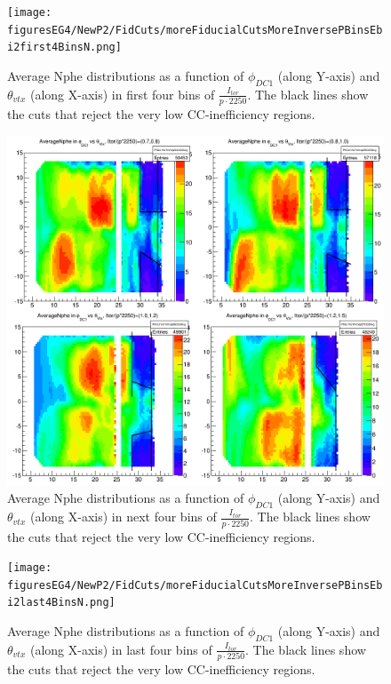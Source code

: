 \begin{figure}[H]%
\centering
\leavevmode \texttt{[image: figuresEG4/NewP2/FidCuts/moreFiducialCutsMoreInversePBinsEbi2first4BinsN.png]}
\caption[Fiducial cuts (first 4 bins)]{Average Nphe distributions as a function of $\phi_{DC1}$ (along Y-axis) and $\theta_{vtx}$ (along X-axis) in first four bins of $\frac{I_{tor}}{p \cdot 2250}$. The black lines show the cuts that reject the very low CC-inefficiency regions.}
\label{figFidAvgNph1}
\end{figure}


\begin{figure}[H]%
\centering
\leavevmode \includegraphics[width=1.1\textwidth]{figuresEG4/NewP2/FidCuts/moreFiducialCutsMoreInversePBinsEbi2next4Bins.png}
\caption[Fiducial cuts (next 4 bins)]{Average Nphe distributions as a function of $\phi_{DC1}$ (along Y-axis) and $\theta_{vtx}$ (along X-axis) in next four bins of $\frac{I_{tor}}{p \cdot 2250}$. The black lines show the cuts that reject the very low CC-inefficiency regions.}
\label{figFidAvgNph1}
\end{figure}


\begin{figure}[H]%
\centering
\leavevmode \texttt{[image: figuresEG4/NewP2/FidCuts/moreFiducialCutsMoreInversePBinsEbi2last4BinsN.png]}
\caption[Fiducial cuts (last 4 bins)]{Average Nphe  distributions as a function of $\phi_{DC1}$ (along Y-axis) and $\theta_{vtx}$ (along X-axis) in last four bins of $\frac{I_{tor}}{p \cdot 2250}$. The black lines show the cuts that reject the very low CC-inefficiency regions.}
\label{figFidAvgNph1}
\end{figure}
